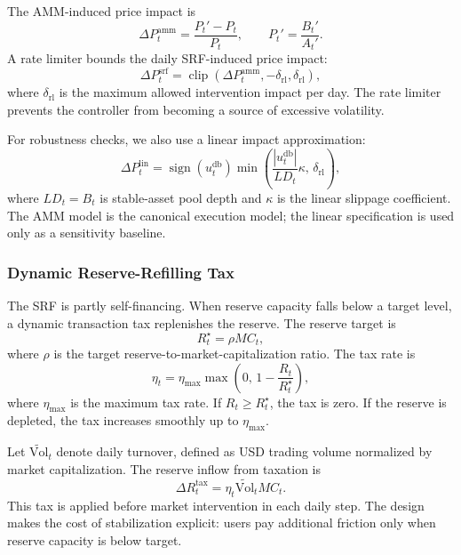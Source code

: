 \documentclass[a4paper,fleqn]{cas-dc}
\begin{document}
The AMM-induced price impact is
\begin{equation}
\Delta P_{t}^{\mathrm{amm}}
=
\frac{P_t'-P_t}{P_t},
\qquad
P_t'=\frac{B_t'}{A_t'}.
\label{eq:amm_impact}
\end{equation}
A rate limiter bounds the daily SRF-induced price impact:
\begin{equation}
\Delta P_t^{\mathrm{srf}}
=
\operatorname{clip}
\left(
\Delta P_t^{\mathrm{amm}},
-\delta_{\mathrm{rl}},
\delta_{\mathrm{rl}}
\right),
\label{eq:rate_limiter}
\end{equation}
where $\delta_{\mathrm{rl}}$ is the maximum allowed intervention impact per day. The rate limiter prevents the controller from becoming a source of excessive volatility.

For robustness checks, we also use a linear impact approximation:
\begin{equation}
\Delta P_t^{\mathrm{lin}}
=
\operatorname{sign}(u_t^{\mathrm{db}})
\min
\left(
\frac{|u_t^{\mathrm{db}}|}{LD_t}\kappa,\,
\delta_{\mathrm{rl}}
\right),
\label{eq:linear_impact}
\end{equation}
where $LD_t=B_t$ is stable-asset pool depth and $\kappa$ is the linear slippage coefficient. The AMM model is the canonical execution model; the linear specification is used only as a sensitivity baseline.

\subsubsection{Dynamic Reserve-Refilling Tax}

The SRF is partly self-financing. When reserve capacity falls below a target level, a dynamic transaction tax replenishes the reserve. The reserve target is
\begin{equation}
R_t^{\star}
=
\rho MC_t,
\label{eq:reserve_target}
\end{equation}
where $\rho$ is the target reserve-to-market-capitalization ratio. The tax rate is
\begin{equation}
\eta_t
=
\eta_{\max}
\max
\left(
0,\,
1-\frac{R_t}{R_t^{\star}}
\right),
\label{eq:dynamic_tax}
\end{equation}
where $\eta_{\max}$ is the maximum tax rate. If $R_t\geq R_t^{\star}$, the tax is zero. If the reserve is depleted, the tax increases smoothly up to $\eta_{\max}$.

Let $\widetilde{\mathrm{Vol}}_t$ denote daily turnover, defined as USD trading volume normalized by market capitalization. The reserve inflow from taxation is
\begin{equation}
\Delta R_t^{\mathrm{tax}}
=
\eta_t \widetilde{\mathrm{Vol}}_t MC_t.
\label{eq:tax_inflow}
\end{equation}
This tax is applied before market intervention in each daily step. The design makes the cost of stabilization explicit: users pay additional friction only when reserve capacity is below target.
\end{document}
